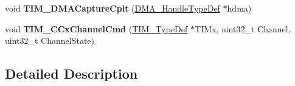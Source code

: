 \begin{DoxyCompactItemize}
\item 
void {\bfseries T\+I\+M\+\_\+\+D\+M\+A\+Capture\+Cplt} (\hyperlink{group___d_m_a___exported___types_ga41b754a906b86bce54dc79938970138b}{D\+M\+A\+\_\+\+Handle\+Type\+Def} $\ast$hdma)\hypertarget{group___t_i_m___private___functions_ga60b9c315720fddb3db32299f05f7d712}{}\label{group___t_i_m___private___functions_ga60b9c315720fddb3db32299f05f7d712}

\item 
void {\bfseries T\+I\+M\+\_\+\+C\+Cx\+Channel\+Cmd} (\hyperlink{struct_t_i_m___type_def}{T\+I\+M\+\_\+\+Type\+Def} $\ast$T\+I\+Mx, uint32\+\_\+t Channel, uint32\+\_\+t Channel\+State)\hypertarget{group___t_i_m___private___functions_ga7fcc6d5ca311c37f5d0250687c899924}{}\label{group___t_i_m___private___functions_ga7fcc6d5ca311c37f5d0250687c899924}

\end{DoxyCompactItemize}


\subsection{Detailed Description}
